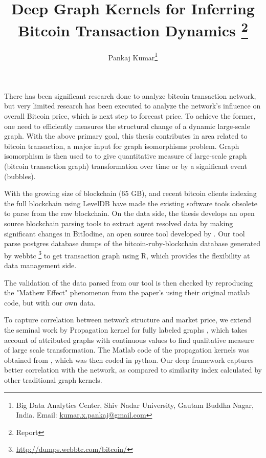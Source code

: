 \documentclass[12pt,a4paper]{article}
\title{Deep Graph Kernels for Inferring Bitcoin Transaction Dynamics \thanks{Report} }
\author{Pankaj Kumar\thanks{Big Data Analytics Center, Shiv Nadar University, Gautam Buddha Nagar, India. Email: \url{kumar.x.pankaj@gmail.com}}}
\date{}
\numberwithin{equation}{section}
\numberwithin{figure}{section}
\numberwithin{table}{section}
\begin{document}
\maketitle
%

There has been significant research done to analyze bitcoin transaction network, but very limited research has been executed to analyze the network’s influence on overall Bitcoin price, which is next step to forecast price. To achieve the former, one need to efficiently measures the structural change of a dynamic large-scale graph. With the above primary goal, this thesis contributes in area related to bitcoin transaction, a major input for graph isomorphisms problem. Graph isomorphism is then used to to give quantitative measure of large-scale graph (bitcoin transaction graph) transformation over time or by a significant event (bubbles).

With the growing size of blockchain (65 GB), and recent bitcoin clients indexing the full blockchain using LevelDB have made the existing software tools obsolete to parse from the raw blockchain. On the data side, the thesis develops an open source blockchain parsing tools to extract agent resolved data by making significant changes in BitIodine, an open source tool developed by \citet{Spagnuolo2013}. Our tool parse postgres database dumps of the bitcoin-ruby-blockchain database generated by webbtc \footnote{\url{http://dumps.webbtc.com/bitcoin/}} to get transaction graph using R, which provides the flexibility at data management side.

The validation of the data parsed from our tool is then checked by reproducing the "Mathew Effect" phenomenon from the \citet{Kondor2014b} paper's using their original matlab code, but with our own data.

To capture correlation between network structure and market price, we extend the seminal work \citep{Yanardag2015} by Propagation kernel for fully labeled graphs \citep{Neumann2015}, which takes account of attributed graphs with continuous values to find qualitative measure of large scale transformation. The Matlab code of the propagation kernels was obtained from \citep{Neumann2015}, which was then coded in python. Our deep framework captures better correlation with the network, as compared to similarity index calculated by other traditional graph kernels. 
\end{document}
